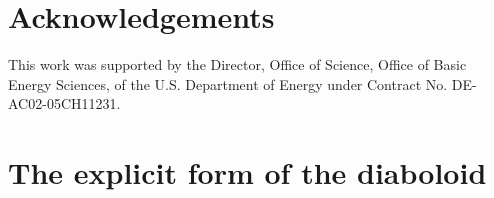 \documentclass{iucr}              %
\begin{document}






\section{Acknowledgements}       
 
 
This work was supported by the Director, Office of Science, Office of Basic Energy Sciences, of the U.S. Department of Energy under Contract No. DE-AC02-05CH11231.

\appendix

\section{The explicit form of the diaboloid }
\label{appendix:diaboloid}
\end{document}

